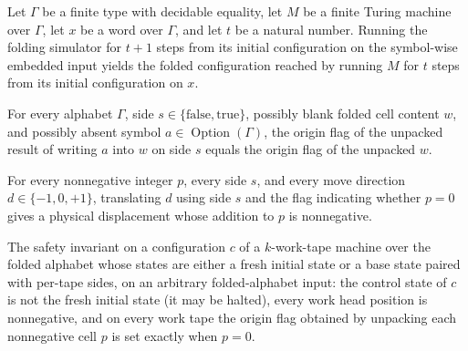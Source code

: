 \begin{lemma}
\label{Turing.FinTM.foldCfg_run}
\leanok
{}
Let $\Gamma$ be a finite type with decidable equality, let $M$ be a finite Turing
machine over $\Gamma$, let $x$ be a word over $\Gamma$, and let $t$ be a natural number.
Running the folding simulator for $t+1$ steps from its initial configuration on the
symbol-wise embedded input yields the folded configuration reached by running $M$ for
$t$ steps from its initial configuration on $x$.
\end{lemma}

\begin{lemma}
\label{Turing.FinTM.foldWrite_origin}
\leanok
{}
For every alphabet $\Gamma$, side $s\in\{\mathrm{false},\mathrm{true}\}$, possibly blank
folded cell content $w$, and possibly absent symbol $a\in\operatorname{Option}(\Gamma)$,
the origin flag of the unpacked result of writing $a$ into $w$ on side $s$ equals the
origin flag of the unpacked $w$.
\end{lemma}

\begin{lemma}
\label{Turing.FinTM.foldMove_nonneg}
\leanok
{}
For every nonnegative integer $p$, every side $s$, and every move direction
$d\in\{-1,0,+1\}$, translating $d$ using side $s$ and the flag indicating whether $p=0$
gives a physical displacement whose addition to $p$ is nonnegative.
\end{lemma}

\begin{definition}
\label{Turing.FinTM.foldSafe}
\leanok
{}
The safety invariant on a configuration $c$ of a $k$-work-tape machine over the
folded alphabet whose states are either a fresh initial state or a base state
paired with per-tape sides, on an arbitrary folded-alphabet input: the control
state of $c$ is not the fresh initial state (it may be halted), every work head
position is nonnegative, and on every work tape the origin flag obtained by
unpacking each nonnegative cell $p$ is set exactly when $p = 0$.
\end{definition}

